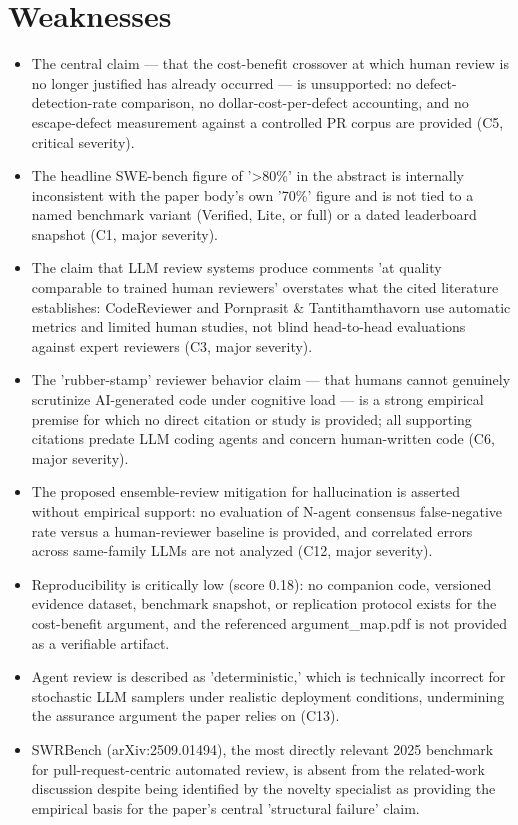 \documentclass[11pt]{article}
\begin{document}
\section*{Weaknesses}
\begin{itemize}[leftmargin=*]
  \item The central claim --- that the cost-benefit crossover at which human review is no longer justified has already occurred --- is unsupported: no defect-detection-rate comparison, no dollar-cost-per-defect accounting, and no escape-defect measurement against a controlled PR corpus are provided (C5, critical severity).
  \item The headline SWE-bench figure of '>80\%' in the abstract is internally inconsistent with the paper body's own '70\%' figure and is not tied to a named benchmark variant (Verified, Lite, or full) or a dated leaderboard snapshot (C1, major severity).
  \item The claim that LLM review systems produce comments 'at quality comparable to trained human reviewers' overstates what the cited literature establishes: CodeReviewer and Pornprasit \& Tantithamthavorn use automatic metrics and limited human studies, not blind head-to-head evaluations against expert reviewers (C3, major severity).
  \item The 'rubber-stamp' reviewer behavior claim --- that humans cannot genuinely scrutinize AI-generated code under cognitive load --- is a strong empirical premise for which no direct citation or study is provided; all supporting citations predate LLM coding agents and concern human-written code (C6, major severity).
  \item The proposed ensemble-review mitigation for hallucination is asserted without empirical support: no evaluation of N-agent consensus false-negative rate versus a human-reviewer baseline is provided, and correlated errors across same-family LLMs are not analyzed (C12, major severity).
  \item Reproducibility is critically low (score 0.18): no companion code, versioned evidence dataset, benchmark snapshot, or replication protocol exists for the cost-benefit argument, and the referenced argument\_map.pdf is not provided as a verifiable artifact.
  \item Agent review is described as 'deterministic,' which is technically incorrect for stochastic LLM samplers under realistic deployment conditions, undermining the assurance argument the paper relies on (C13).
  \item SWRBench (arXiv:2509.01494), the most directly relevant 2025 benchmark for pull-request-centric automated review, is absent from the related-work discussion despite being identified by the novelty specialist as providing the empirical basis for the paper's central 'structural failure' claim.
\end{itemize}
\end{document}
